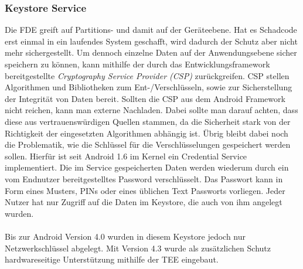 	\subsubsection{Keystore Service}
	Die FDE greift auf Partitions- und damit auf der Geräteebene. Hat es Schadcode erst einmal in ein laufendes System geschafft, wird dadurch der Schutz aber nicht mehr sichergestellt. Um dennoch einzelne Daten auf der Anwendungsebene sicher speichern zu können, kann mithilfe der durch das Entwicklungsframework bereitgestellte \textit{Cryptography Service Provider (CSP)} zurückgreifen. CSP stellen Algorithmen und Bibliotheken zum Ent-/Verschlüsseln, sowie zur Sicherstellung der Integrität von Daten bereit. Sollten die CSP aus dem Android Framework nicht reichen, kann man externe Nachladen. Dabei sollte man darauf achten, dass diese aus vertrauenswürdigen Quellen stammen, da die Sicherheit stark von der Richtigkeit der eingesetzten Algorithmen abhängig ist. Übrig bleibt dabei noch die Problematik, wie die Schlüssel für die Verschlüsselungen gespeichert werden sollen. Hierfür ist seit Android 1.6 im Kernel ein Credential Service implementiert. Die im Service gespeicherten Daten werden wiederum durch ein vom Endnutzer bereitgestelltes Password verschlüsselt. Das Passwort kann in Form eines Musters, PINs oder eines üblichen Text Passworts vorliegen. Jeder Nutzer hat nur Zugriff auf die Daten im Keystore, die auch von ihm angelegt wurden.\\\\	
	Bis zur Android Version 4.0 wurden in diesem Keystore jedoch nur Netzwerkschlüssel abgelegt. Mit Version 4.3 wurde als zusätzlichen Schutz hardwareseitige Unterstützung mithilfe der TEE eingebaut.\cite[S. 175]{Drake2014}
